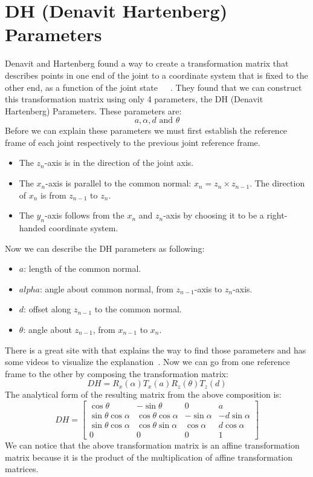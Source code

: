 \section{DH (Denavit \- Hartenberg) Parameters}
Denavit and Hartenberg found a way to create a transformation matrix that describes points in one end of the joint to a coordinate system that is fixed to the other end, as a function of the joint state~\cite{dhparam1}~\cite{dhparam2}~\cite{introroboticscraigbook}. They found that we can construct this transformation matrix using only 4 parameters, the DH (Denavit \- Hartenberg) Parameters. These parameters are: 
\[a,\alpha,d \text{ and } \theta\]
Before we can explain these parameters we must first establish the reference frame of each joint respectively to the previous joint reference frame.
\begin{itemize}
\item The \(z_n\)-axis is in the direction of the joint axis. 
\item The \(x_n\)-axis is parallel to the common normal: \(x_n = z_n \times z_{n-1}\). The direction of \(x_n\) is from \(z_{n - 1}\) to \(z_n\).
\item The \(y_n\)-axis follows from the \(x_n\)  and \(z_n\)-axis by choosing it to be a right-handed coordinate system.
\end{itemize}
Now we can describe the DH parameters as following:
\begin{itemize}
\item\(a\): length of the common normal.
\item\(alpha\): angle about common normal, from \(z_{n-1}\)-axis to \(z_n\)-axis.
\item\(d\): offset along \(z_{n-1}\) to the common normal.
\item\(\theta\): angle about \(z_{n-1}\), from \(x_{n-1}\) to \(x_n\).
\end{itemize}
There is a great site with that explains the way to find those parameters and has some videos to visualize the explanation~\cite{tekkotsu}.
Now we can go from one reference frame to the other by composing the transformation matrix:
\[DH = R_x(\alpha)T_x(a)R_z(\theta)T_z(d)\]
The analytical form of the resulting matrix from the above composition is:
\[
DH = 
\begin{bmatrix}
\cos\theta & -\sin\theta & 0 & a\\
\sin\theta\cos\alpha & \cos\theta\cos\alpha & -\sin\alpha & -d\sin\alpha\\
\sin\theta\cos\alpha & \cos\theta\sin\alpha & \cos\alpha & d\cos\alpha\\
0 & 0 & 0 & 1
\end{bmatrix}
\]
We can notice that the above transformation matrix is an affine transformation matrix because it is the product of the multiplication of affine transformation matrices.


